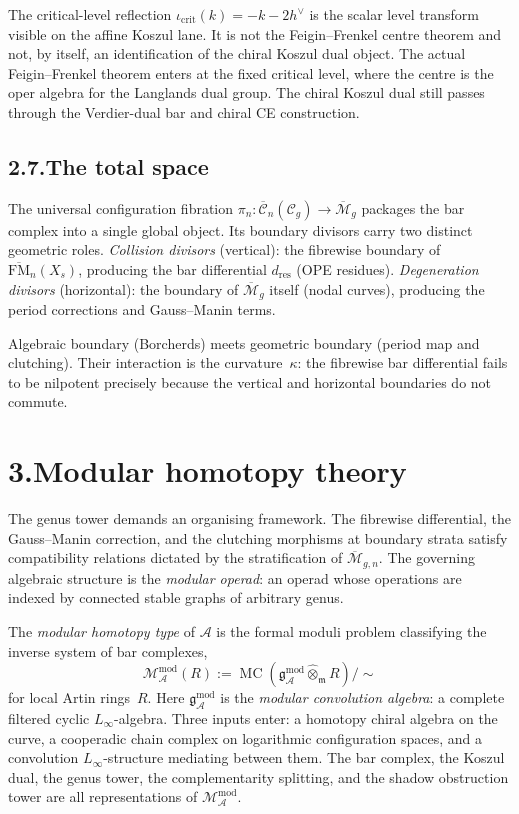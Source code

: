 \documentclass[11pt]{report}
\theoremstyle{definition}
\theoremstyle{remark}
\providecommand{\cA}{\mathcal{A}}
\providecommand{\cM}{\mathcal{M}}
\numberwithin{equation}{section}
\begin{document}
The critical-level reflection
\(\iota_{\mathrm{crit}}(k)=-k-2h^\vee\) is the scalar level transform
visible on the affine Koszul lane. It is not the Feigin--Frenkel
centre theorem and not, by itself, an identification of the chiral
Koszul dual object. The actual Feigin--Frenkel theorem enters at the
fixed critical level, where the centre is the oper algebra for the
Langlands dual group. The chiral Koszul dual still passes through the
Verdier-dual bar and chiral CE construction.

\subsection*{2.7.\enspace The total space}

The universal configuration fibration
$\pi_n\colon\overline{\mathcal C}_n(\mathcal C_g)\to\overline{\mathcal M}_g$
packages the bar complex into a single global object. Its boundary
divisors carry two distinct geometric roles. \emph{Collision
divisors} (vertical): the fibrewise boundary of
$\overline{\mathrm{FM}}_n(X_s)$, producing the bar differential
$d_{\mathrm{res}}$ (OPE residues). \emph{Degeneration divisors}
(horizontal): the boundary of $\overline{\mathcal M}_g$ itself (nodal
curves), producing the period corrections and Gauss--Manin terms.

Algebraic boundary (Borcherds) meets geometric boundary (period map
and clutching). Their interaction is the curvature~$\kappa$: the
fibrewise bar differential fails to be nilpotent precisely because
the vertical and horizontal boundaries do not commute.


\section*{3.\quad Modular homotopy theory}

The genus tower demands an organising framework. The fibrewise
differential, the Gauss--Manin correction, and the clutching morphisms
at boundary strata satisfy compatibility relations dictated by the
stratification of $\overline{\cM}_{g,n}$. The governing algebraic
structure is the \emph{modular operad}: an operad whose operations are
indexed by connected stable graphs of arbitrary genus.

The \emph{modular homotopy type} of $\cA$ is the formal moduli problem
classifying the inverse system of bar complexes,
\[
\mathcal M^{\mathrm{mod}}_\cA(R):=\operatorname{MC}(\mathfrak g^{\mathrm{mod}}_\cA\widehat\otimes_{\mathfrak m}R)/{\sim}
\]
for local Artin rings~$R$. Here $\mathfrak g^{\mathrm{mod}}_\cA$ is
the \emph{modular convolution algebra}: a complete filtered cyclic
$L_\infty$-algebra. Three inputs enter: a homotopy chiral algebra on
the curve, a cooperadic chain complex on logarithmic configuration
spaces, and a convolution $L_\infty$-structure mediating between them.
The bar complex, the Koszul dual, the genus tower, the
complementarity splitting, and the shadow obstruction tower are all
representations of $\mathcal M^{\mathrm{mod}}_\cA$.
\end{document}
